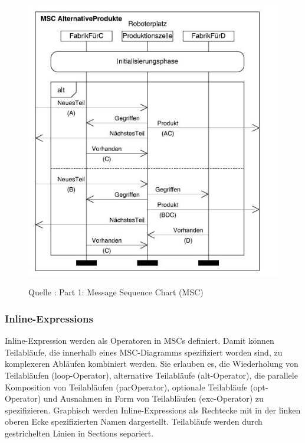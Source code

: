 \begin{center}
\begin{figure}[h]
   

\includegraphics[scale=1]{Graphics/MSCmit.jpg}



Quelle : \cite{MT009}
Part 1: Message Sequence Chart (MSC) 

 
\label{fig8}


\end{figure}

\end{center}
\newpage
\subsubsection{Inline-Expressions}
Inline-Expression werden als Operatoren in MSCs definiert. Damit können Teilabläufe,
die innerhalb eines MSC-Diagramms spezifiziert worden sind, zu komplexeren Abläufen kombiniert werden. Sie erlauben es, die Wiederholung von Teilabläufen (loop-Operator),
alternative Teilabläufe (alt-Operator), die parallele Komposition von Teilabläufen (parOperator), optionale Teilabläufe (opt-Operator) und Ausnahmen in Form von Teilabläufen (exc-Operator) zu spezifizieren. Graphisch werden Inline-Expressions als Rechtecke mit in der linken oberen Ecke spezifizierten Namen dargestellt. Teilabläufe werden durch gestrichelten Linien in Sections separiert.
